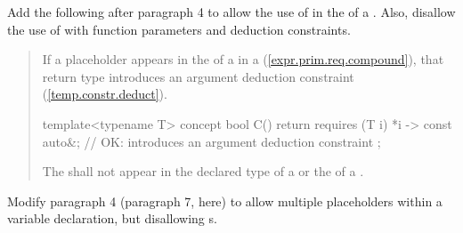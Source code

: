 Add the following after paragraph 4 to allow the use of  in the
 of a .
Also, disallow the use of  with function parameters
and deduction constraints.

\begin{quote}
\begin{addedblock}
\pnum
If a placeholder appears in the 
of a  in a  
(\ref{expr.prim.req.compound}), that return type introduces an argument 
deduction constraint (\ref{temp.constr.deduct}).
% 
\enterexample
\begin{codeblock}
template<typename T> concept bool C() {
  return requires (T i) { 
    {*i} -> const auto&; // OK: introduces an argument deduction constraint
  };
}
\end{codeblock}
\exitexample

\pnum
The   shall not appear
in the declared type of a  or the
 of a .
\end{addedblock}
\end{quote}


Modify paragraph 4 (paragraph 7, here) to allow multiple placeholders within a 
variable declaration, but disallowing s.

